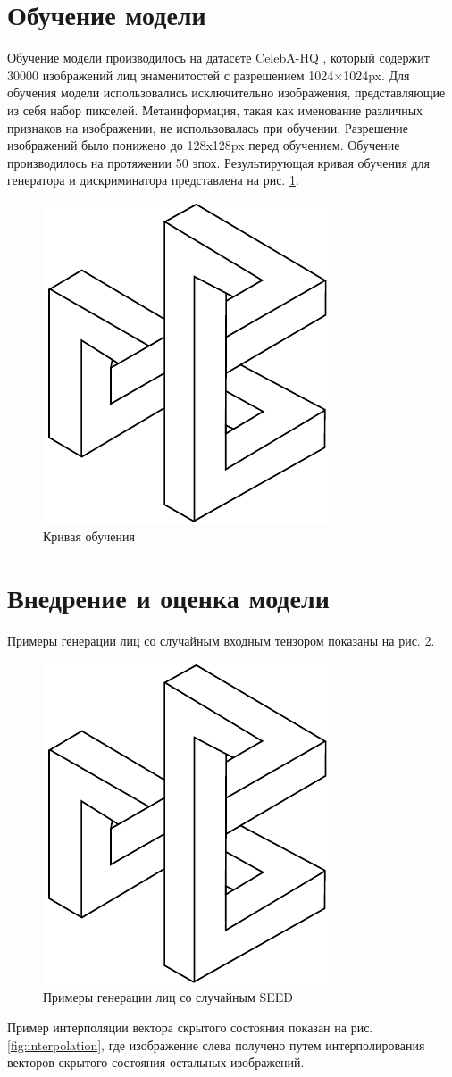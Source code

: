\documentclass[60x84/16,8pt]{ittmm}
\begin{document}
\section{Обучение модели}
\label{sec:base-section}

Обучение модели производилось на датасете CelebA-HQ \cite{celeba-hq},
который содержит 30000 изображений лиц знаменитостей с разрешением 1024×1024px.
Для обучения модели использовались исключительно изображения,
представляющие из себя набор пикселей. Метаинформация, такая как именование
различных признаков на изображении, не использовалась при обучении.
Разрешение изображений было понижено до 128x128px перед обучением.
Обучение производилось на протяжении 50 эпох. Результирующая кривая
обучения для генератора и дискриминатора представлена на рис. \ref{fig:learning-curve}.

\begin{figure}
  \centering
  \includegraphics[width=0.2\linewidth]{embl}
  \caption{Кривая обучения}
  \label{fig:learning-curve}
\end{figure}

\section{Внедрение и оценка модели}
\label{sec:base-section}

Примеры генерации лиц со случайным входным тензором показаны на рис. \ref{fig:result-random-seed}.

\begin{figure}
  \centering
  \includegraphics[width=0.2\linewidth]{embl}
  \caption{Примеры генерации лиц со случайным SEED}
  \label{fig:result-random-seed}
\end{figure}

Пример интерполяции вектора скрытого состояния показан на рис. \ref{fig:interpolation}, где изображение слева
получено путем интерполирования векторов скрытого состояния остальных изображений.
\end{document}
